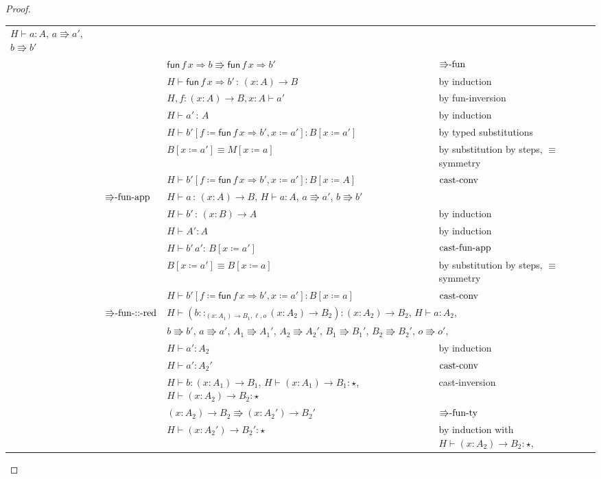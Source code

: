 \begin{proof}
\begin{tabular}{llll}
{$H\vdash a:A$, $a\Rrightarrow a'$, $b\Rrightarrow b'$}\tabularnewline
 &  & $\mathsf{fun}\,f\,x\Rightarrow b\Rrightarrow\mathsf{fun}\,f\,x\Rightarrow b'$ & $\textrm{\ensuremath{\Rrightarrow}-fun}$\tabularnewline
 &  & $H\vdash\mathsf{fun}\,f\,x\Rightarrow b'\,:\,\left(x:A\right)\rightarrow B$ & by induction\tabularnewline
 &  & $H,f:\left(x:A\right)\rightarrow B,x:A\vdash a'$ & by fun-inversion\tabularnewline
 &  & $H\vdash a'\,:\,A$ & by induction\tabularnewline
 &  & $H\vdash b'\left[f\coloneqq\mathsf{fun}\,f\,x\Rightarrow b',x\coloneqq a'\right]:B\left[x\coloneqq a'\right]$ & by typed substitutions\tabularnewline
 &  & $B\left[x\coloneqq a'\right]\equiv M\left[x\coloneqq a\right]$ & by substitution by steps, $\equiv$ symmetry\tabularnewline
 &  & $H\vdash b'\left[f\coloneqq\mathsf{fun}\,f\,x\Rightarrow b',x\coloneqq a'\right]:B\left[x\coloneqq A\right]$ & $\operatorname{cast-conv}$\tabularnewline
 & $\textrm{\ensuremath{\Rrightarrow}-fun-app}$ & $H\vdash a\,:\,\left(x:A\right)\rightarrow B$, $H\vdash a:A$, $a\Rrightarrow a'$,
$b\Rrightarrow b'$ & \tabularnewline
 &  & $H\vdash b'\,:\,\left(x:B\right)\rightarrow A$ & by induction\tabularnewline
 &  & $H\vdash A':A$ & by induction\tabularnewline
 &  & $H\vdash b'\,a':\,B\left[x\coloneqq a'\right]$ & $\operatorname{cast-fun-app}$\tabularnewline
 &  & $B\left[x\coloneqq a'\right]\equiv B\left[x\coloneqq a\right]$ & by substitution by steps, $\equiv$ symmetry\tabularnewline
 &  & $H\vdash b'\left[f\coloneqq\mathsf{fun}\,f\,x\Rightarrow b',x\coloneqq a'\right]:B\left[x\coloneqq a\right]$ & $\operatorname{cast-conv}$\tabularnewline
 & $\textrm{\ensuremath{\Rrightarrow}-fun-::-red}$ & \multicolumn{2}{l}{$H\vdash\left(b::_{\left(x:A_{1}\right)\rightarrow B_{1},\ensuremath{\ell},o}\left(x:A_{2}\right)\rightarrow B_{2}\right):\left(x:A_{2}\right)\rightarrow B_{2}$,
$H\vdash a:A_{2}$, }\tabularnewline
 &  & \multicolumn{2}{l}{$b\Rrightarrow b'$, $a\Rrightarrow a'$, $A_{1}\Rrightarrow A_{1}'$,
$A_{2}\Rrightarrow A_{2}'$, $B_{1}\Rrightarrow B_{1}'$, $B_{2}\Rrightarrow B_{2}'$,
$o\Rrightarrow o'$, }\tabularnewline
 &  & $H\vdash a':A_{2}$ & by induction\tabularnewline
 &  & $H\vdash a':A_{2}'$ & $\operatorname{cast-conv}$\tabularnewline
 &  & $H\vdash b:\left(x:A_{1}\right)\rightarrow B_{1}$, $H\vdash\left(x:A_{1}\right)\rightarrow B_{1}:\star$,
$H\vdash\left(x:A_{2}\right)\rightarrow B_{2}:\star$ & cast-inversion \tabularnewline
 &  & $\left(x:A_{2}\right)\rightarrow B_{2}\Rrightarrow\left(x:A_{2}'\right)\rightarrow B_{2}'$ & $\textrm{\ensuremath{\Rrightarrow}-fun-ty}$\tabularnewline
 &  & $H\vdash\left(x:A_{2}'\right)\rightarrow B_{2}':\star$ & by induction with $H\vdash\left(x:A_{2}\right)\rightarrow B_{2}:\star$,

\end{tabular}
\end{proof}
